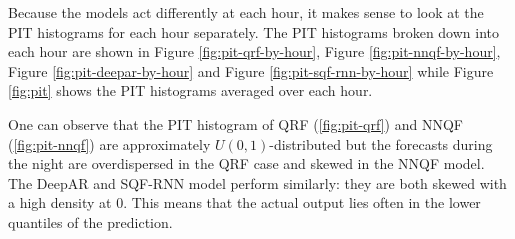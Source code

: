 Because the models act differently at each hour, it makes sense 
to look at the PIT histograms for each hour separately. 
The PIT histograms broken down into each hour are shown in Figure \ref{fig:pit-qrf-by-hour}, Figure \ref{fig:pit-nnqf-by-hour}, 
Figure \ref{fig:pit-deepar-by-hour} and Figure \ref{fig:pit-sqf-rnn-by-hour} 
while Figure \ref{fig:pit} shows the PIT histograms averaged over each hour.

One can observe that the PIT histogram of QRF (\ref{fig:pit-qrf}) and NNQF (\ref{fig:pit-nnqf}) are approximately 
\(U(0,1)\)-distributed but the forecasts during the night are overdispersed in the QRF case and 
skewed in the NNQF model.
The DeepAR and SQF-RNN model perform similarly: they are both skewed with a high density at \(0\). 
This means that the actual output lies often in the lower quantiles of the prediction. 